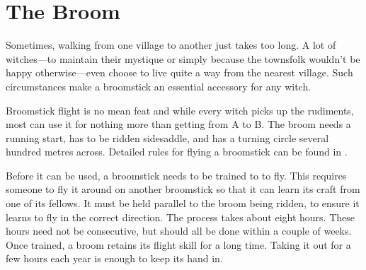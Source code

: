 




\section{The Broom}

Sometimes, walking from one village to another just takes too long.
A lot of witches---to maintain their mystique or simply because the townsfolk wouldn't be happy otherwise---even choose to live quite a way from the nearest village.
Such circumstances make a broomstick an essential accessory for any witch.

Broomstick flight is no mean feat and while every witch picks up the rudiments, most can use it for nothing more than getting from A to B.
The broom needs a running start, has to be ridden sidesaddle, and has a turning circle several hundred metres across.
Detailed rules for flying a broomstick can be found in .

Before it can be used, a broomstick needs to be trained to to fly.
This requires someone to fly it around on another broomstick so that it can learn its craft from one of its fellows.
It must be held parallel to the broom being ridden, to ensure it learns to fly in the correct direction.
The process takes about eight hours.
These hours need not be consecutive, but should all be done within a couple of weeks.
Once trained, a broom retains its flight skill for a long time.
Taking it out for a few hours each year is enough to keep its hand in.


